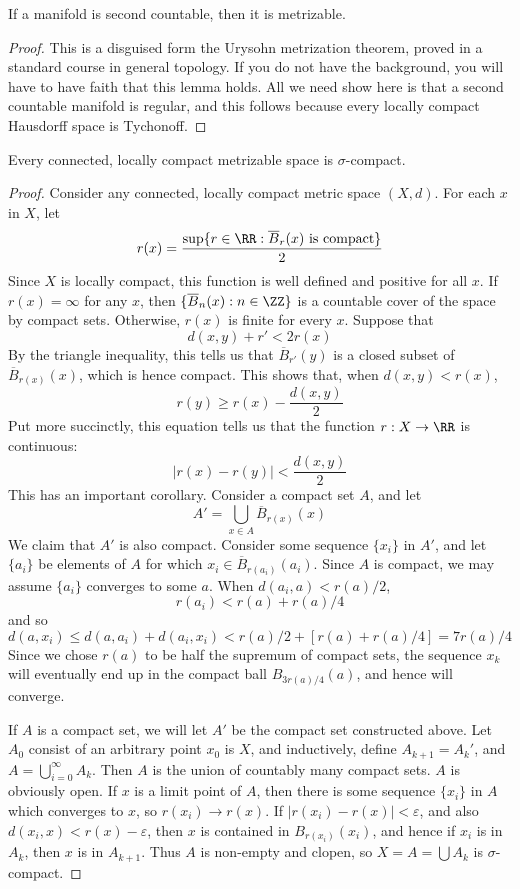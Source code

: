 \begin{lemma}[$2) \to (3$]
    If a manifold is second countable, then it is metrizable.
\end{lemma}
\begin{proof}
    This is a disguised form the Urysohn metrization theorem, proved in a standard course in general topology. If you do not have the background, you will have to have faith that this lemma holds. All we need show here is that a second countable manifold is regular, and this follows because every locally compact Hausdorff space is Tychonoff.
\end{proof}

\begin{lemma}[$3) \to (1$]
    Every connected, locally compact metrizable space is $\sigma$-compact.
\end{lemma}
\begin{proof}
    Consider any connected, locally compact metric space $(X,d)$. For each $x$ in $X$, let
    \[ r(x) = \frac{\sup \{ r \in \RR : \overline{B}_r(x)\ \text{is compact} \}}{2} \]
    Since $X$ is locally compact, this function is well defined and positive for all $x$. If $r(x) = \infty$ for any $x$, then $\{ \overline{B}_n(x) : n \in \ZZ \}$ is a countable cover of the space by compact sets. Otherwise, $r(x)$ is finite for every $x$. Suppose that
    \[ d(x,y) + r' < 2r(x) \]
    By the triangle inequality, this tells us that $\overline{B}_{r'}(y)$ is a closed subset of $\overline{B}_{r(x)}(x)$, which is hence compact. This shows that, when $d(x,y) < r(x)$,
    \[ r(y) \geq r(x) - \frac{d(x,y)}{2} \]
    Put more succinctly, this equation tells us that the function $r:X \to \RR$ is continuous:
    \[ |r(x) - r(y)| < \frac{d(x,y)}{2} \]
    This has an important corollary. Consider a compact set $A$, and let
    \[ A' = \bigcup_{x \in A} \overline{B}_{r(x)}(x) \]
    We claim that $A'$ is also compact. Consider some sequence $\{ x_i \}$ in $A'$, and let $\{ a_i \}$ be elements of $A$ for which $x_i \in \overline{B}_{r(a_i)}(a_i)$. Since $A$ is compact, we may assume $\{ a_i \}$ converges to some $a$. When $d(a_i, a) < r(a)/2$,
    \[ r(a_i) < r(a) + r(a)/4 \]
    and so
    \[ d(a,x_i) \leq d(a,a_i) + d(a_i,x_i) < r(a)/2 + [r(a) + r(a)/4] = 7r(a)/4 \]
    Since we chose $r(a)$ to be half the supremum of compact sets, the sequence $x_k$ will eventually end up in the compact ball $B_{3r(a)/4}(a)$, and hence will converge.

    If $A$ is a compact set, we will let $A'$ be the compact set constructed above. Let $A_0$ consist of an arbitrary point $x_0$ is $X$, and inductively, define $A_{k+1} = A_k'$, and $A = \bigcup_{i = 0}^\infty A_k$. Then $A$ is the union of countably many compact sets. $A$ is obviously open. If $x$ is a limit point of $A$, then there is some sequence $\{ x_i \}$ in $A$ which converges to $x$, so $r(x_i) \to r(x)$. If $|r(x_i) - r(x)| < \varepsilon$, and also $d(x_i,x) < r(x) - \varepsilon$, then $x$ is contained in $B_{r(x_i)}(x_i)$, and hence if $x_i$ is in $A_k$, then $x$ is in $A_{k+1}$. Thus $A$ is non-empty and clopen, so $X = A = \bigcup A_k$ is $\sigma$-compact.
\end{proof}

